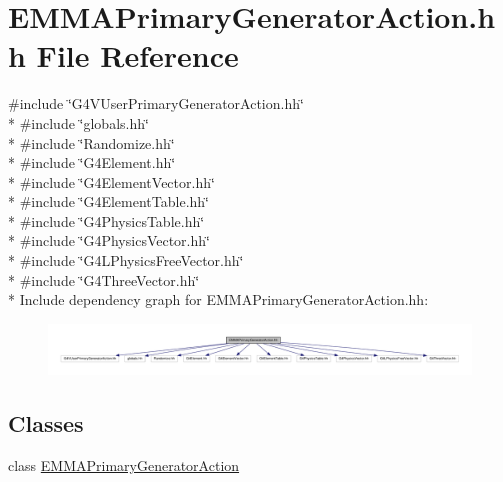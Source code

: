 \hypertarget{EMMAPrimaryGeneratorAction_8hh}{}\section{E\+M\+M\+A\+Primary\+Generator\+Action.\+hh File Reference}
\label{EMMAPrimaryGeneratorAction_8hh}
{\ttfamily \#include \char`\"{}G4\+V\+User\+Primary\+Generator\+Action.\+hh\char`\"{}}\\*
{\ttfamily \#include \char`\"{}globals.\+hh\char`\"{}}\\*
{\ttfamily \#include \char`\"{}Randomize.\+hh\char`\"{}}\\*
{\ttfamily \#include \char`\"{}G4\+Element.\+hh\char`\"{}}\\*
{\ttfamily \#include \char`\"{}G4\+Element\+Vector.\+hh\char`\"{}}\\*
{\ttfamily \#include \char`\"{}G4\+Element\+Table.\+hh\char`\"{}}\\*
{\ttfamily \#include \char`\"{}G4\+Physics\+Table.\+hh\char`\"{}}\\*
{\ttfamily \#include \char`\"{}G4\+Physics\+Vector.\+hh\char`\"{}}\\*
{\ttfamily \#include \char`\"{}G4\+L\+Physics\+Free\+Vector.\+hh\char`\"{}}\\*
{\ttfamily \#include \char`\"{}G4\+Three\+Vector.\+hh\char`\"{}}\\*
Include dependency graph for E\+M\+M\+A\+Primary\+Generator\+Action.\+hh\+:
\nopagebreak
\begin{figure}[H]
\begin{center}
\leavevmode
\includegraphics[width=350pt]{EMMAPrimaryGeneratorAction_8hh__incl}
\end{center}
\end{figure}
\subsection*{Classes}
\begin{DoxyCompactItemize}
\item 
class \hyperlink{classEMMAPrimaryGeneratorAction}{E\+M\+M\+A\+Primary\+Generator\+Action}
\end{DoxyCompactItemize}
